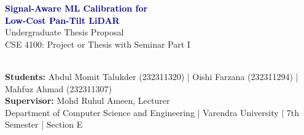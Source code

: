 \documentclass[aspectratio=169]{beamer}
\begin{document}

\begin{frame}[plain]
    \begin{center}
        \vspace{0.8cm}
        {\Huge \bfseries \textcolor{navy}{Signal-Aware ML Calibration for\\[0.2cm] Low-Cost Pan-Tilt LiDAR}} \\[0.6cm]
        {\Large Undergraduate Thesis Proposal} \\[0.2cm]
        {\large CSE 4100: Project or Thesis with Seminar Part I} \\[0.8cm]
        
        \\[0.8cm]

        {\small 
        \textbf{Students:} Abdul Momit Talukder (232311320) | Oishi Farzana (232311294) | Mahfuz Ahmad (232311307) \\[0.1cm]
        \textbf{Supervisor:} Mohd Ruhul Ameen, Lecturer \\[0.1cm]
        Department of Computer Science and Engineering | Varendra University | 7th Semester | Section E
        }
    \end{center}
\end{frame}
\end{document}
